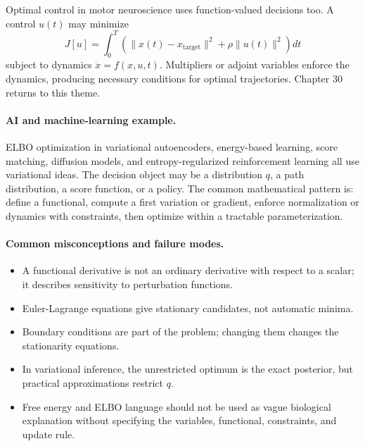 Optimal control in motor neuroscience uses function-valued decisions too. A control \(u(t)\) may minimize
\[
J[u]=\int_0^T \left(\|x(t)-x_{\mathrm{target}}\|^2+\rho\|u(t)\|^2\right)dt
\]
subject to dynamics \(\dot x=f(x,u,t)\). Multipliers or adjoint variables enforce the dynamics, producing necessary conditions for optimal trajectories. Chapter 30 returns to this theme.

\paragraph{AI and machine-learning example.}
ELBO optimization in variational autoencoders, energy-based learning, score matching, diffusion models, and entropy-regularized reinforcement learning all use variational ideas. The decision object may be a distribution \(q\), a path distribution, a score function, or a policy. The common mathematical pattern is: define a functional, compute a first variation or gradient, enforce normalization or dynamics with constraints, then optimize within a tractable parameterization.

\paragraph{Common misconceptions and failure modes.}
\begin{itemize}[leftmargin=*]
\item A functional derivative is not an ordinary derivative with respect to a scalar; it describes sensitivity to perturbation functions.
\item Euler-Lagrange equations give stationary candidates, not automatic minima.
\item Boundary conditions are part of the problem; changing them changes the stationarity equations.
\item In variational inference, the unrestricted optimum is the exact posterior, but practical approximations restrict \(q\).
\item Free energy and ELBO language should not be used as vague biological explanation without specifying the variables, functional, constraints, and update rule.
\end{itemize}

